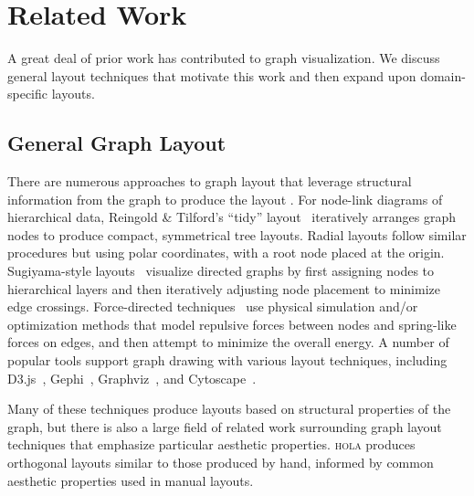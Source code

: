 \section{Related Work}

A great deal of prior work has contributed to graph visualization.
We discuss general layout techniques that motivate this work and
then expand upon domain-specific layouts.

\subsection{General Graph Layout}
There are numerous approaches to graph layout that leverage structural
information from the graph to produce the layout \cite{herman2000graph,eades2010graph,gibson2013survey}.
For node-link diagrams of hierarchical data, Reingold \& Tilford's ``tidy'' 
layout~\cite{reingold1981tidier} iteratively arranges graph nodes to
produce compact, symmetrical tree layouts.
Radial layouts  follow similar procedures but using polar coordinates, with a root node placed at the origin.
Sugiyama-style layouts~\cite{sugiyama1981methods} visualize directed graphs by first assigning nodes to hierarchical layers and then iteratively adjusting node placement to minimize edge crossings.
Force-directed techniques~\cite{tutte1963draw,kobourov2012spring,quinn1979forced,fruchterman1991graph} 
use physical simulation and/or optimization methods that model repulsive forces between nodes and spring-like forces on edges, and then attempt to minimize the overall energy. 
A number of popular tools support graph drawing with various layout 
techniques, including D3.js~\cite{bostock:d3}, Gephi~\cite{bastian2009gephi},
Graphviz~\cite{ellson2001graphviz}, and Cytoscape~\cite{shannon2003cytoscape}.

Many of these techniques produce layouts based on structural
properties of the graph, but there is also a large field of 
related work surrounding graph layout techniques that emphasize particular
aesthetic properties. \textsc{hola} \cite{kieffer2016hola} produces orthogonal 
layouts similar to those produced by hand, informed by common aesthetic properties 
used in manual layouts.


